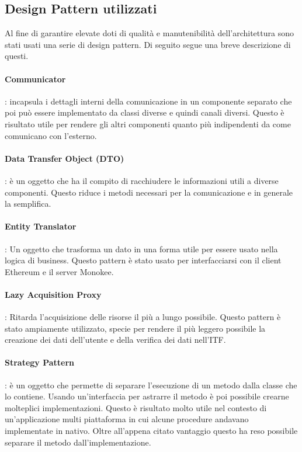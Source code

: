 \subsection{Design Pattern utilizzati}
Al fine di garantire elevate doti di qualità e manutenibilità dell’architettura sono stati usati una serie di design pattern. Di seguito segue una breve descrizione di questi.

\paragraph{Communicator}: incapsula i dettagli interni della comunicazione in un componente separato che poi può essere implementato da classi diverse e quindi canali diversi. Questo è risultato utile per rendere gli altri componenti quanto più indipendenti da come comunicano con l’esterno.

\paragraph{Data Transfer Object (DTO)}: è un oggetto che ha il compito di racchiudere le informazioni utili a diverse componenti. Questo riduce i metodi necessari per la comunicazione e in generale la semplifica.

\paragraph{Entity Translator}: Un oggetto che trasforma un dato in una forma utile per essere usato nella logica di business. Questo pattern è stato usato per interfacciarsi con il client Ethereum e il server Monokee.

\paragraph{Lazy Acquisition Proxy}: Ritarda l’acquisizione delle risorse il più a lungo possibile. Questo pattern è stato ampiamente utilizzato, specie per rendere il più leggero possibile la creazione dei dati dell’utente e della verifica dei dati nell’ITF.

\paragraph{Strategy Pattern}: è un oggetto che permette di separare l’esecuzione di un metodo dalla classe che lo contiene. Usando un’interfaccia per astrarre il metodo è poi possibile crearne molteplici implementazioni. Questo è risultato molto utile nel contesto di un’applicazione multi piattaforma in cui alcune procedure andavano implementate in nativo. Oltre all’appena citato vantaggio questo ha reso possibile separare il metodo dall’implementazione.

